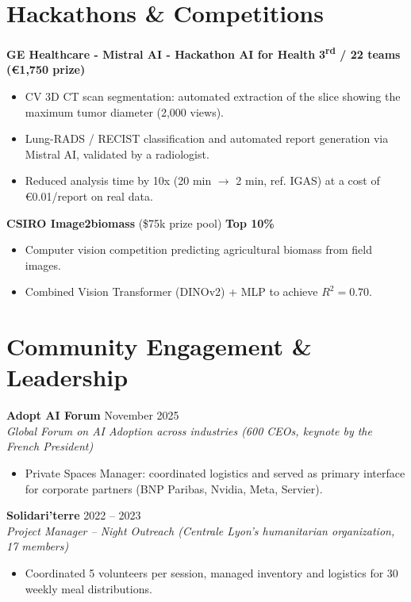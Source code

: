 \documentclass[10pt, a4paper]{article}
\begin{document}
\section{Hackathons \& Competitions}

\textbf{GE Healthcare - Mistral AI - Hackathon AI for Health} \hfill \textbf{3\textsuperscript{rd} / 22 teams (€1,750 prize)}
\begin{itemize}
    \item CV 3D CT scan segmentation: automated extraction of the slice showing the maximum tumor diameter (2,000 views).
    \item Lung-RADS / RECIST classification and automated report generation via Mistral AI, validated by a radiologist.
    \item Reduced analysis time by 10x (20 min $\rightarrow$ 2 min, ref. IGAS) at a cost of €0.01/report on real data.
\end{itemize}

\textbf{CSIRO Image2biomass} (\$75k prize pool) \hfill \textbf{Top 10\%}
\begin{itemize}
    \item Computer vision competition predicting agricultural biomass from field images.
    \item Combined Vision Transformer (DINOv2) + MLP to achieve $R^2 = 0.70$.
\end{itemize}

\section{Community Engagement \& Leadership}

\textbf{Adopt AI Forum} \hfill November 2025\\
\textit{Global Forum on AI Adoption across industries (600 CEOs, keynote by the French President)}
\begin{itemize}
    \item Private Spaces Manager: coordinated logistics and served as primary interface for corporate partners (BNP Paribas, Nvidia, Meta, Servier).
\end{itemize}

\textbf{Solidari'terre} \hfill 2022 -- 2023\\
\textit{Project Manager -- Night Outreach (Centrale Lyon's humanitarian organization, 17 members)}
\begin{itemize}
    \item Coordinated 5 volunteers per session, managed inventory and logistics for 30 weekly meal distributions.
\end{itemize}
\end{document}
